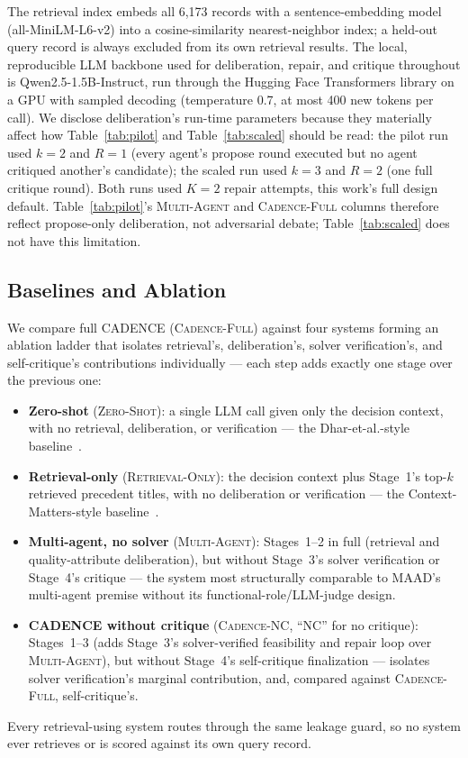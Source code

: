 \documentclass[preprint,12pt,authoryear]{elsarticle}
\newcommand{\sysZS}{\textsc{Zero-Shot}}
\newcommand{\sysRO}{\textsc{Retrieval-Only}}
\newcommand{\sysMA}{\textsc{Multi-Agent}}
\newcommand{\sysNC}{\textsc{Cadence-NC}}
\newcommand{\sysFull}{\textsc{Cadence-Full}}
\renewcommand{\_}{\textunderscore\allowbreak{}}
\begin{document}
The retrieval index embeds all 6{,}173 records with a sentence-embedding model (all-MiniLM-L6-v2) into a cosine-similarity nearest-neighbor index; a held-out query record is always excluded from its own retrieval results. The local, reproducible LLM backbone used for deliberation, repair, and critique throughout is Qwen2.5-1.5B-Instruct, run through the Hugging Face Transformers library on a GPU with sampled decoding (temperature 0.7, at most 400 new tokens per call). We disclose deliberation's run-time parameters because they materially affect how Table~\ref{tab:pilot} and Table~\ref{tab:scaled} should be read: the pilot run used $k=2$ and $R=1$ (every agent's propose round executed but no agent critiqued another's candidate); the scaled run used $k=3$ and $R=2$ (one full critique round). Both runs used $K=2$ repair attempts, this work's full design default. Table~\ref{tab:pilot}'s \sysMA{} and \sysFull{} columns therefore reflect propose-only deliberation, not adversarial debate; Table~\ref{tab:scaled} does not have this limitation.

\subsection{Baselines and Ablation}

We compare full CADENCE (\sysFull{}) against four systems forming an ablation ladder that isolates retrieval's, deliberation's, solver verification's, and self-critique's contributions individually --- each step adds exactly one stage over the previous one:

\begin{itemize}[leftmargin=*,itemsep=1pt,topsep=2pt,parsep=0pt]
\item \textbf{Zero-shot} (\sysZS{}): a single LLM call given only the decision context, with no retrieval, deliberation, or verification --- the Dhar-et-al.-style baseline~\citep{dhar2024llm}.
\item \textbf{Retrieval-only} (\sysRO{}): the decision context plus Stage~1's top-$k$ retrieved precedent titles, with no deliberation or verification --- the Context-Matters-style baseline~\citep{contextmatters2026}.
\item \textbf{Multi-agent, no solver} (\sysMA{}): Stages~1--2 in full (retrieval and quality-attribute deliberation), but without Stage~3's solver verification or Stage~4's critique --- the system most structurally comparable to MAAD's~\citep{maad2025} multi-agent premise without its functional-role/LLM-judge design.
\item \textbf{CADENCE without critique} (\sysNC{}, ``NC'' for no critique): Stages~1--3 (adds Stage~3's solver-verified feasibility and repair loop over \sysMA{}), but without Stage~4's self-critique finalization --- isolates solver verification's marginal contribution, and, compared against \sysFull{}, self-critique's.
\end{itemize}
Every retrieval-using system routes through the same leakage guard, so no system ever retrieves or is scored against its own query record.
\end{document}
